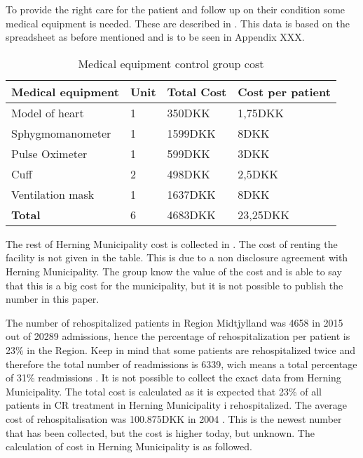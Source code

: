 To provide the right care for the patient and follow up on their condition some medical equipment is needed. These are described in . This data is based on the spreadsheet as before mentioned and is to be seen in Appendix XXX.

\begin{table}[H]
\begin{longtabu} to \linewidth{l l l l}
    \textbf{Medical equipment} & \textbf{Unit} &\textbf{Total Cost} & \textbf{Cost per patient} \\[-1ex]
    \midrule
    Model of heart   &  1 &  350DKK & 1,75DKK \\ \hline
    Sphygmomanometer  & 1 & 1599DKK & 8DKK  \\ \hline
    Pulse Oximeter    &  1 & 599DKK &   3DKK \\ \hline 
    Cuff    &  2 & 498DKK  &   2,5DKK  \\ \hline 
    Ventilation mask   &  1 & 1637DKK  &   8DKK \\
    \hline \hline \hline
    \textbf{Total} & 6 & 4683DKK & 23,25DKK
    \newline
    \newline
   \end{longtabu}
\caption{Medical equipment control group cost}
\label{tab: MeC}
\end{table}

The rest of Herning Municipality cost is collected in . The cost of renting the facility is not given in the table. This is due to a non disclosure agreement with Herning Municipality. The group know the value of the cost and is able to say that this is a big cost for the municipality, but it is not possible to publish the number in this paper. 

The number of rehospitalized patients in Region Midtjylland was 4658 in 2015 out of 20289 admissions, hence the percentage of rehospitalization per patient is 23\% in the Region. Keep in mind that some patients are rehospitalized twice and therefore the total number of readmissions is 6339, wich means a total percentage of 31\% readmissions \cite{hjertetal}. It is not possible to collect the exact data from Herning Municipality. The total cost is calculated as it is expected that 23\% of all patients in CR treatment in Herning Municipality i rehospitalized. The average cost of rehospitalisation was 100.875DKK in 2004 \cite{rasmussen2011hjerterehabilitering}. This is the newest number that has been collected, but the cost is higher today, but unknown. The calculation of cost in Herning Municipality is as followed.

